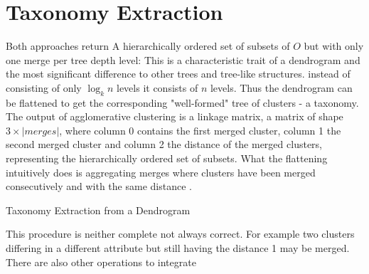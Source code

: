 \section{Taxonomy Extraction}
Both approaches return A hierarchically ordered set of subsets of $O$ but with only one merge per tree depth level: This is a characteristic trait of a dendrogram and the most significant difference to other trees and tree-like structures. instead of consisting of only $\log_k n$ levels it consists of $n$ levels. Thus the dendrogram can be flattened to get the corresponding "well-formed" tree of clusters - a taxonomy. \\
The output of agglomerative clustering is a linkage matrix, a matrix of shape $3 \times |merges|$, where column 0 contains the first merged cluster, column 1 the second merged cluster and column 2 the distance of the merged clusters, representing the hierarchically ordered set of subsets.
What the flattening intuitively does is aggregating merges where clusters have been merged consecutively and with the same distance . 
\begin{algorithm}[htp]
\caption{Taxonomy Extraction from a Dendrogram}\label{taxo}
\end{algorithm}
This procedure is neither complete not always correct. For example two clusters differing in a different attribute but still having the distance 1 may be merged. There are also other operations to integrate 

